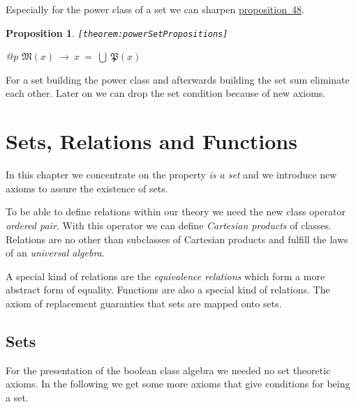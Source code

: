 \documentclass[a4paper,german,10pt,twoside]{book}
\newtheorem{prop}[thm]{Proposition}
\theoremstyle{definition}
\theoremstyle{remark}
\begin{document}
\par
Especially for the power class of a set we can sharpen \hyperlink{theorem:powerPropositions}{proposition~48}.

\begin{prop}
\label{theorem:powerSetPropositions} \hypertarget{theorem:powerSetPropositions}{}
{\tt \tiny [\verb]theorem:powerSetPropositions]]}
\mbox{}
\begin{longtable}{{@{\extracolsep{\fill}}p{\linewidth}}}
\centering $\mathfrak{M}(x)\ \rightarrow\ x \ = \ \bigcup \ \mathfrak{P}(x)$
\end{longtable}

\end{prop}

For a set building the power class and afterwards building the set sum eliminate each other.
Later on we can drop the set condition because of new axioms.




\chapter{Sets, Relations and Functions} \label{chapter5} \hypertarget{chapter5}{}

In this chapter we concentrate on the property \emph{is a set} and we introduce new axioms to assure
the existence of sets.

\par
To be able to define relations within our theory we need the new class operator \emph{ordered pair}. 
With this operator we can define \emph{Cartesian products} of classes. Relations are no other
than subclasses of Cartesian products and fulfill the laws of an \emph{universal algebra}.

\par
A special kind of relations are the \emph{equivalence relations} which form a more abstract form of 
equality. Functions are also a special kind of relations. The axiom of replacement guaranties that
sets are mapped onto sets.

\section{Sets} \label{chapter5_section1} \hypertarget{chapter5_section1}{}
For the presentation of the boolean class algebra we needed no set theoretic axioms. In the following
we get some more axioms that give conditions for being a set.
\end{document}
